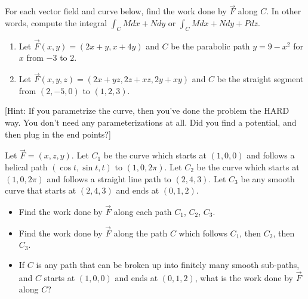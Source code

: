 \begin{problem}
%
For each vector field and curve below, find the work done by $\vec F$ along $C$. In other words, compute the integral $\int_C Mdx+Ndy$ or $\int_C Mdx+Ndy+Pdz$. 
\begin{enumerate}
 \item{}%
 Let $\vec F(x,y) = (2x+y,x+4y)$ and $C$ be the parabolic path $y=9-x^2$ for $x$ from $-3$ to $2$.
 \item{}%
 Let $\vec F(x,y,z) = (2x+yz,2z+xz,2y+xy)$ and $C$ be the straight segment from $(2,-5,0)$ to $(1,2,3)$. 
\end{enumerate}
[Hint: If you parametrize the curve, then you've done the problem the HARD way. You don't need any parameterizations at all. Did you find a potential, and then plug in the end points?]
\end{problem}

\begin{problem}%
  Let $\vec F = (x,z,y)$. Let $C_1$ be the curve which starts at $(1,0,0)$ and follows a helical path $(\cos t, \sin t, t)$ to $(1,0,2\pi)$. Let $C_2$ be the curve which starts at $(1,0, 2\pi)$ and follows a straight line path to $(2,4,3)$. Let $C_3$ be any smooth curve that starts at $(2,4,3)$ and ends at $(0,1,2)$.
 \begin{itemize}
  \item Find the work done by $\vec F$ along each path $C_1$, $C_2$, $C_3$. 
  \item Find the work done by $\vec F$ along the path $C$ which follows $C_1$, then $C_2$, then $C_3$.  
  \item If $C$ is any path that can be broken up into finitely many smooth sub-paths, and $C$ starts at $(1,0,0)$ and ends at $(0,1,2)$, what is the work done by $\vec F$ along $C$?
 \end{itemize}
\end{problem}

